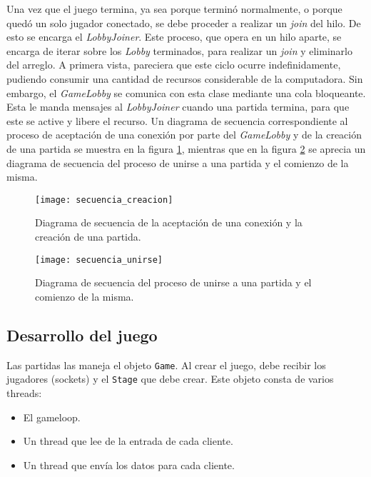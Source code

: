 \indent Una vez que el juego termina, ya sea porque terminó normalmente, o porque quedó un solo jugador conectado, se debe proceder a realizar un \textit{\emph{join}} del hilo. De esto se encarga el \textit{\emph{LobbyJoiner}}. Este proceso, que opera en un hilo aparte, se encarga de iterar sobre los \textit{Lobby} terminados, para realizar un \textit{join} y eliminarlo del arreglo. A primera vista, pareciera que este ciclo ocurre indefinidamente, pudiendo consumir una cantidad de recursos considerable de la computadora. Sin embargo, el \textit{GameLobby} se comunica con esta clase mediante una cola bloqueante. Esta le manda mensajes al \textit{LobbyJoiner} cuando una partida termina, para que este se active y libere el recurso. Un diagrama de secuencia correspondiente al proceso de aceptación de una conexión por parte del \textit{GameLobby} y de la creación de una partida se muestra en la figura \ref{im:secuencia_creacion}, mientras que en la figura \ref{im:secuencia_unirse} se aprecia un diagrama de secuencia del proceso de unirse a una partida y el comienzo de la misma.

\begin{figure}
	\centering
	\texttt{[image: secuencia\_creacion]}
	\caption{Diagrama de secuencia de la aceptación de una conexión y la creación de una partida.}
	\label{im:secuencia_creacion}
\end{figure}

\begin{figure}
	\centering
	\texttt{[image: secuencia\_unirse]}
	\caption{Diagrama de secuencia del proceso de unirse a una partida y el comienzo de la misma.}
	\label{im:secuencia_unirse}
\end{figure}

\subsection{Desarrollo del juego}
Las partidas las maneja el objeto \texttt{Game}. Al crear el juego, debe recibir los jugadores (sockets) y el
\texttt{Stage} que debe crear. Este objeto consta de varios threads:

\begin{itemize}
    \item El gameloop.
    \item Un thread que lee de la entrada de cada cliente.
    \item Un thread que env\'ia los datos para cada cliente.
\end{itemize}


